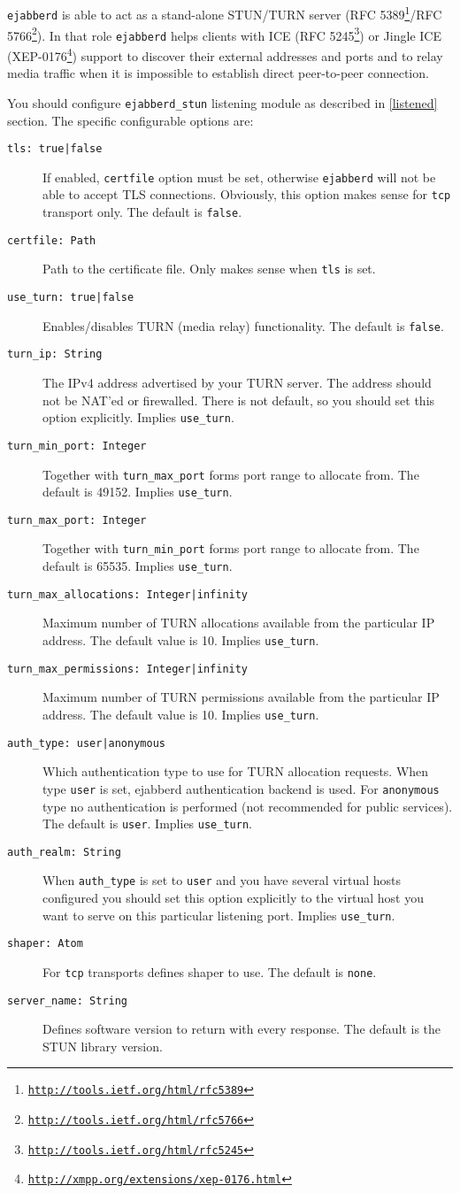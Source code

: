 \documentclass[a4paper,10pt]{book}
\newcommand{\ind}[1]{\begin{latexonly}\index{#1}\end{latexonly}}
\newcommand{\makesubsection}[2]{ \aname{#1}{} \subsection{\ahrefloc{#1}{#2}} \label{#1} }
\newcommand{\bracehack}{\def\{{\char"7B}\def\}{\char"7D}}
\newcommand{\titem}[1]{\item[\bracehack\texttt{#1}]}
\newcommand{\option}[1]{\texttt{#1}}
\newcommand{\term}[1]{\texttt{#1}}
\newcommand{\ejabberd}{\texttt{ejabberd}}
\gdef\footahref#1#2{#2\footnote{\href{#1}{\texttt{#1}}}}
\newcommand{\txepref}[2]{\footahref{http://xmpp.org/extensions/xep-#1.html}{#2}}
\newcommand{\xepref}[1]{\txepref{#1}{XEP-#1}}
\begin{document}
\makesubsection{stun}{STUN and TURN}
\ind{options!stun}\ind{stun}

\ejabberd{} is able to act as a stand-alone STUN/TURN server
(\footahref{http://tools.ietf.org/html/rfc5389}{RFC 5389}/\footahref{http://tools.ietf.org/html/rfc5766}{RFC 5766}). In that role \ejabberd{} helps clients with ICE (\footahref{http://tools.ietf.org/html/rfc5245}{RFC 5245}) or Jingle ICE (\xepref{0176}) support to discover their external addresses and ports and to relay media traffic when it is impossible to establish direct
peer-to-peer connection.

You should configure \term{ejabberd\_stun} listening module as described in \ref{listened} section.
The specific configurable options are:
\begin{description}
  \titem{tls: true|false}
  If enabled, \option{certfile} option must be set, otherwise \ejabberd{}
  will not be able to accept TLS connections. Obviously, this option
  makes sense for \term{tcp} transport only. The default is \term{false}.
  \titem{certfile: Path}
  Path to the certificate file. Only makes sense when \option{tls} is set.
  \titem{use\_turn: true|false}
  Enables/disables TURN (media relay) functionality. The default is \term{false}.
  \titem{turn\_ip: String}
  The IPv4 address advertised by your TURN server. The address should not be NAT'ed
  or firewalled. There is not default, so you should set this option explicitly.
  Implies \term{use\_turn}.
  \titem{turn\_min\_port: Integer}
  Together with \option{turn\_max\_port} forms port range to allocate from.
  The default is 49152. Implies \term{use\_turn}.
  \titem{turn\_max\_port: Integer}
  Together with \option{turn\_min\_port} forms port range to allocate from.
  The default is 65535. Implies \term{use\_turn}.
  \titem{turn\_max\_allocations: Integer|infinity}
  Maximum number of TURN allocations available from the particular IP address.
  The default value is 10. Implies \term{use\_turn}.
  \titem{turn\_max\_permissions: Integer|infinity}
  Maximum number of TURN permissions available from the particular IP address.
  The default value is 10. Implies \term{use\_turn}.
  \titem{auth\_type: user|anonymous}
  Which authentication type to use for TURN allocation requests. When type \term{user}
  is set, ejabberd authentication backend is used. For \term{anonymous} type
  no authentication is performed (not recommended for public services).
  The default is \term{user}. Implies \term{use\_turn}.
  \titem{auth\_realm: String}
  When \option{auth\_type} is set to \term{user} and you have several virtual
  hosts configured you should set this option explicitly to the virtual host
  you want to serve on this particular listening port. Implies \term{use\_turn}.
  \titem{shaper: Atom}
  For \term{tcp} transports defines shaper to use. The default is \term{none}.
  \titem{server\_name: String}
  Defines software version to return with every response. The default is the
  STUN library version.
\end{description}
\end{document}
